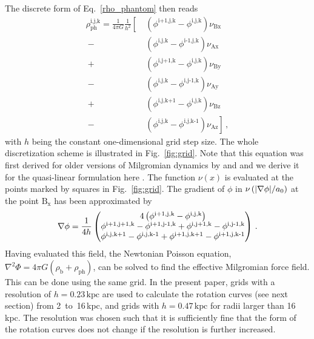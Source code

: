 \documentclass[useAMS,usenatbib]{mn2e}
\newcommand{\PhiN}{\phi}
\newcommand{\grad}{{\bf \nabla}}
\begin{document}
The discrete form of Eq.~\ref{rho_phantom} then reads
\begin{align}
	\rho_\text{ph}^\text{i,j,k} = \frac{1}{4\pi G}  \frac{1}{h^{2}}  \left[\right.\ 
		&\left( \PhiN^{\text{i+1,j,k}} - \PhiN^\text{i,j,k} \right) \nu_{\text{Bx}} \label{eq:phantom_dm}\\
	\ -	& \left( \PhiN^\text{i,j,k} 	- \PhiN^\text{i-1,j,k}	\right) \nu_{\text{Ax}} \nonumber \\
	\ +	& \left( \PhiN^\text{i,j+1,k}	- \PhiN^\text{i,j,k}	\right) \nu_{\text{By}} \nonumber \\
	\ -	& \left( \PhiN^\text{i,j,k}	- \PhiN^\text{i,j-1,k}	\right) \nu_{\text{Ay}} \nonumber \\
	\ +	& \left( \PhiN^\text{i,j,k+1}	- \PhiN^\text{i,j,k}	\right) \nu_{\text{Bz}} \nonumber \\
	\ -	& \left( \PhiN^\text{i,j,k}	- \PhiN^\text{i,j,k-1}	\right) \nu_{\text{Az}} \left.\right] \,,\nonumber
\end{align} 
with $h$ being the constant one-dimensional grid step size. The whole discretization scheme is illustrated in Fig.~\ref{fig:grid}. Note that this equation was first derived for older versions of Milgromian dynamics by \citet{BradaMilgrom1999} and \citet{Tiret2007} and we derive it for the quasi-linear formulation here \citep[see also][]{Angus1,Angus2}.
The function $\nu(x)$ is evaluated at the points marked by squares in Fig.~\ref{fig:grid}.
The gradient of $\PhiN$ in $\nu\left(|{\mathbf\grad} \PhiN|/a_0\right)$ at the point $\text{B}_\text{x}$ has been approximated by
\begin{align}\label{eq:gradient}
\grad \PhiN = \frac{1}{4h}\begin{pmatrix} 
	4\left(	\PhiN^\text{i+1,j,k}	- \PhiN^\text{i,j,k} \right) \\
	\PhiN^\text{i+1,j+1,k}- \PhiN^\text{i+1,j-1,k} + \PhiN^\text{i,j+1,k} - \PhiN^\text{i,j-1,k} \\
	\PhiN^\text{i,j,k+1}	- \PhiN^\text{i,j,k-1} + \PhiN^\text{i+1,j,k+1} - \PhiN^\text{i+1,j,k-1} \\
\end{pmatrix} \,.
\end{align}
Having evaluated this field, the Newtonian Poisson equation,
$ \nabla^2 \Phi=4 \pi G \left( \rho_\text{b} + \rho_\text{ph} \right)$,
can be solved to find the effective Milgromian force field. This can be done using the same grid. In the present paper, grids with a resolution of $h=0.23\,\text{kpc}$ are used to calculate the rotation curves (see next section) from 2~to~16\,kpc, and grids with $h=0.47\,\text{kpc}$ for radii larger than 16\,kpc.
The resolution was chosen such that it is sufficiently fine that the form of the rotation curves does not change if the resolution is further increased.
\end{document}
